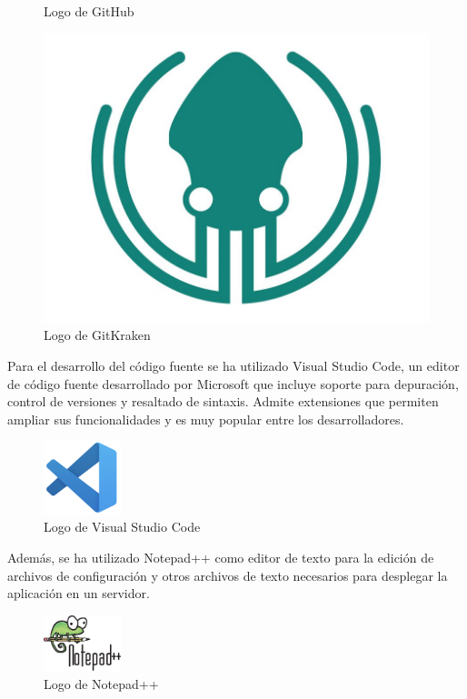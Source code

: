 \begin{figure}[H]
\begin{minipage}{0.2\textwidth}
        \caption{Logo de GitHub}
    \end{minipage}
    \hfill
    \begin{minipage}{0.3\textwidth}
        \centering
        \includegraphics[width=\textwidth]{figures/7-Construccion/GitKraken.jpeg}
        \caption{Logo de GitKraken}
    \end{minipage}
\end{figure}

Para el desarrollo del código fuente se ha utilizado Visual Studio Code, 
un editor de código fuente desarrollado por Microsoft que incluye soporte para depuración, control de versiones y resaltado de sintaxis.
Admite extensiones que permiten ampliar sus funcionalidades y es muy popular entre los desarrolladores.

\begin{figure}[H]
    \centering
    \includegraphics[width=0.2\textwidth]{figures/7-Construccion/VSCode.png}
    \caption{Logo de Visual Studio Code}
\end{figure}

Además, se ha utilizado Notepad++ como editor de texto para la edición de archivos de configuración y otros archivos de texto
necesarios para desplegar la aplicación en un servidor.

\begin{figure}[H]
    \centering
    \includegraphics[width=0.2\textwidth]{figures/7-Construccion/Notepad.png}
    \caption{Logo de Notepad++}
\end{figure}


